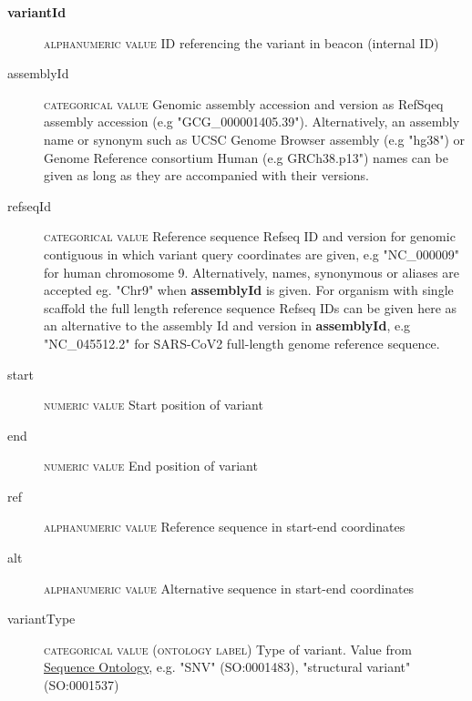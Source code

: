 \documentclass[a4paper, 10pt]{article}        %
\begin{document}
\begin{description}
	\item[\textbf{variantId}] {\textsc{alphanumeric value}} ID referencing the variant in beacon (internal ID)
	\item[assemblyId] {\textsc{categorical value}} Genomic assembly accession and version as RefSqeq assembly accession (e.g "GCG\_000001405.39"). Alternatively, an assembly name or synonym such as UCSC Genome Browser assembly (e.g "hg38") or Genome Reference consortium Human (e.g GRCh38.p13") names can be given as long as they are accompanied with their versions. 
 	\item[refseqId] {\textsc{categorical value}} Reference sequence Refseq ID and version for genomic contiguous in which variant query coordinates are given, e.g "NC\_000009" for human chromosome 9. Alternatively, names, synonymous or aliases are accepted eg. "Chr9" when \textbf{assemblyId} is given. For organism with single scaffold the full length reference sequence Refseq IDs can be given here as an alternative to the assembly Id and version in \textbf{assemblyId}, e.g "NC\_045512.2" for SARS-CoV2 full-length genome reference sequence. 
	\item[start] {\textsc{numeric value}} Start position of variant
	\item[end] {\textsc{numeric value}} End position of variant %
	\item[ref] {\textsc{alphanumeric value}} Reference sequence in start-end coordinates
	\item[alt] {\textsc{alphanumeric value}} Alternative sequence in start-end coordinates
	\item[variantType] {\textsc{categorical value (ontology label)}} Type of variant. Value from \href{http://www.sequenceontology.org}{Sequence Ontology}, e.g. "SNV" (SO:0001483), "structural variant"  (SO:0001537)
 \end{description}
 
\end{document}
